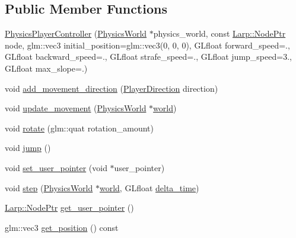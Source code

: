 \subsection*{Public Member Functions}
\begin{DoxyCompactItemize}
\item 
\hyperlink{classPhysicsPlayerController_a5e35a8bbba953a855c0ffa605ed58f07}{Physics\+Player\+Controller} (\hyperlink{classPhysicsWorld}{Physics\+World} $\ast$physics\+\_\+world, const \hyperlink{namespaceLarp_a171c1dc8b70cfb441b15d7386780db23}{Larp\+::\+Node\+Ptr} node, glm\+::vec3 initial\+\_\+position=glm\+::vec3(0, 0, 0), G\+Lfloat forward\+\_\+speed=., G\+Lfloat backward\+\_\+speed=., G\+Lfloat strafe\+\_\+speed=., G\+Lfloat jump\+\_\+speed=3., G\+Lfloat max\+\_\+slope=.)
\item 
void \hyperlink{classPhysicsPlayerController_a9980ea5d6d8b96826d8a86ff7a9e8716}{add\+\_\+movement\+\_\+direction} (\hyperlink{classPhysicsPlayerController_a947993cc77a553b6a30c9ea95c81de5e}{Player\+Direction} direction)
\item 
void \hyperlink{classPhysicsPlayerController_a611f5a0cdc5b9f74376880c47dc997a4}{update\+\_\+movement} (\hyperlink{classPhysicsWorld}{Physics\+World} $\ast$\hyperlink{test_8cpp_a886e828cea798fce290a7b76f5921d3b}{world})
\item 
void \hyperlink{classPhysicsPlayerController_a540179190225822c918851855f3fadbf}{rotate} (glm\+::quat rotation\+\_\+amount)
\item 
void \hyperlink{classPhysicsPlayerController_a392fedfa034d9fbd261fd6d4d348b2ce}{jump} ()
\item 
void \hyperlink{classPhysicsPlayerController_a976d927f76cb9fd366c303660d24c585}{set\+\_\+user\+\_\+pointer} (void $\ast$user\+\_\+pointer)
\item 
void \hyperlink{classPhysicsPlayerController_a1e32faab6f2e50c13c9a9e64e3163079}{step} (\hyperlink{classPhysicsWorld}{Physics\+World} $\ast$\hyperlink{test_8cpp_a886e828cea798fce290a7b76f5921d3b}{world}, G\+Lfloat \hyperlink{test_8cpp_a45742981446f2bedcf5573ca6b329564}{delta\+\_\+time})
\item 
\hyperlink{namespaceLarp_a171c1dc8b70cfb441b15d7386780db23}{Larp\+::\+Node\+Ptr} \hyperlink{classPhysicsPlayerController_aa7f40ea9fc5b1ef645972e0f2b0042ed}{get\+\_\+user\+\_\+pointer} ()
\item 
glm\+::vec3 \hyperlink{classPhysicsPlayerController_a18889e54457b7f91196d9302fd524775}{get\+\_\+position} () const 
\item 

\end{DoxyCompactItemize}

